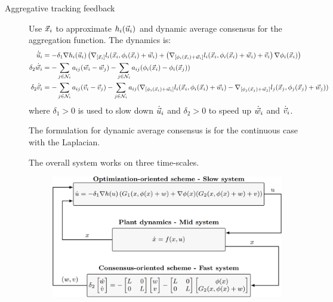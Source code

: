\begin{description}
    \item[Aggregative tracking feedback] 
        Use ${\vec{x}}_i$ to approximate $h_i({\vec{u}}_i)$ and dynamic average consensus for the aggregation function. The dynamics is:
        \[
            \begin{split}
                \dot{{\vec{u}}}_i &= -\delta_1 \nabla h_i({\vec{u}}_i) \left( \nabla_{[{\vec{x}}_i]} l_i({\vec{x}}_i, \phi_i({\vec{x}}_i)+{\vec{w}}_i) + \left( \nabla_{[\phi_i({\vec{x}}_i)+{\vec{w}}_i]} l_i({\vec{x}}_i, \phi_i({\vec{x}}_i)+{\vec{w}}_i) + {\vec{v}}_i \right) \nabla \phi_i({\vec{x}}_i) \right) \\
                \delta_2 \dot{{\vec{w}}}_i &= - \sum_{j \in \mathcal{N}_i} a_{ij} ({\vec{w}}_i - {\vec{w}}_j) - \sum_{j \in \mathcal{N}_i} a_{ij} (\phi_i({\vec{x}}_i) - \phi_i({\vec{x}}_j)) \\
                \delta_2 \dot{{\vec{v}}}_i &= - \sum_{j \in \mathcal{N}_i} a_{ij} ({\vec{v}}_i - {\vec{v}}_j) - \sum_{j \in \mathcal{N}_i} a_{ij} (\nabla_{[\phi_i({\vec{x}}_i)+{\vec{w}}_i]} l_i({\vec{x}}_i, \phi_i({\vec{x}}_i)+{\vec{w}}_i) - \nabla_{[\phi_j({\vec{x}}_j)+{\vec{w}}_j]} l_j({\vec{x}}_j, \phi_j({\vec{x}}_j)+{\vec{w}}_j)) \\
            \end{split}
        \]
        where $\delta_1 > 0$ is used to slow down $\dot{{\vec{u}}}_i$ and $\delta_2 > 0$ to speed up $\dot{{\vec{w}}}_i$ and $\dot{{\vec{v}}}_i$.

        \begin{remark}
            The formulation for dynamic average consensus is for the continuous case with the Laplacian.
        \end{remark}

        \begin{remark}
            The overall system works on three time-scales.
            \begin{figure}[H]
                \centering
                \includegraphics[width=0.6\linewidth]{./img/feedback_distributed.png}
            \end{figure}
        \end{remark}
\end{description}

